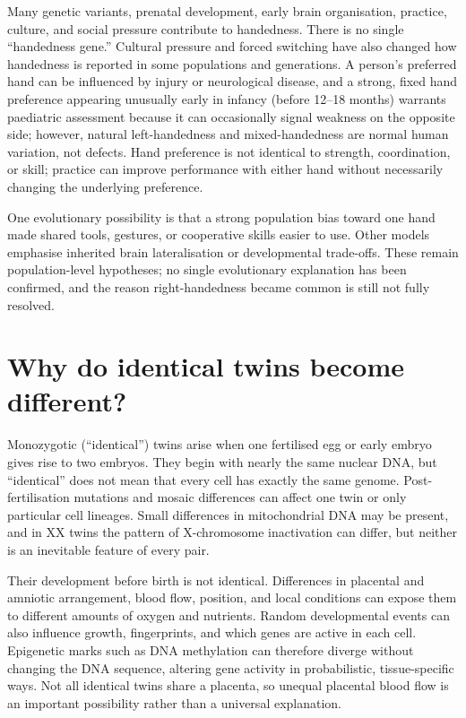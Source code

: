 \documentclass[11pt,oneside]{report}
\begin{document}
Many genetic variants, prenatal development, early brain organisation, practice,
culture, and social pressure contribute to handedness. There is no single
``handedness gene.'' Cultural pressure and forced switching have also changed
how handedness is reported in some populations and generations. A person's
preferred hand can be influenced by injury or neurological disease, and a
strong, fixed hand preference appearing unusually early in infancy (before
12--18 months) warrants paediatric assessment because it can occasionally signal
weakness on the opposite side; however, natural left-handedness and
mixed-handedness are normal human variation, not defects.
Hand preference is not identical to strength, coordination, or skill; practice
can improve performance with either hand without necessarily changing the
underlying preference.

One evolutionary possibility is that a strong population bias toward one hand
made shared tools, gestures, or cooperative skills easier to use. Other models
emphasise inherited brain lateralisation or developmental trade-offs. These
remain population-level hypotheses; no single evolutionary explanation has been
confirmed, and the reason right-handedness became common is still not fully
resolved.

\section{Why do identical twins become different?}

Monozygotic (``identical'') twins arise when one fertilised egg or early embryo
gives rise to two embryos. They begin with nearly the same nuclear DNA, but
``identical'' does not mean that every cell has exactly the same genome.
Post-fertilisation mutations and mosaic differences can affect one twin or only
particular cell lineages. Small differences in mitochondrial DNA may be present,
and in XX twins the pattern of X-chromosome inactivation can differ, but neither
is an inevitable feature of every pair.

Their development before birth is not identical. Differences in placental and
amniotic arrangement, blood flow, position, and local conditions can expose them
to different amounts of oxygen and nutrients. Random developmental events can
also influence growth, fingerprints, and which genes are active in each cell.
Epigenetic marks such as DNA methylation can therefore diverge without changing
the DNA sequence, altering gene activity in probabilistic, tissue-specific ways.
Not all identical twins share a placenta, so unequal placental blood flow is an
important possibility rather than a universal explanation.
\end{document}

